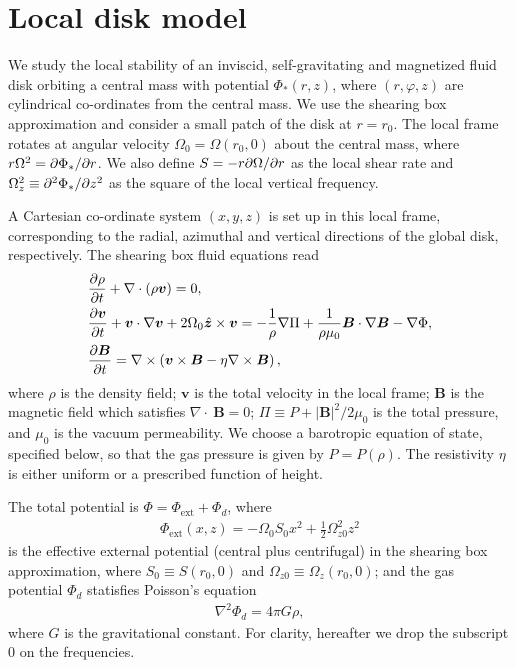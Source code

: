 \section{Local disk model}\label{setup}
We study the local stability of an inviscid, self-gravitating and
magnetized fluid disk orbiting a central mass with
potential $\Phi_*(r,z)$, where $(r,\varphi,z)$ are cylindrical
co-ordinates from the central mass. We use the shearing box approximation     
\citep{goldreich65b} and consider a small patch of the disk at
$r=r_0$. The local frame rotates at angular velocity 
$\Omega_0=\Omega(r_0,0)$ about the central mass, where $r\Omega^2 =
\partial\Phi_*/\partial r$. We also define $S=-r\partial\Omega/\partial r$ as the local shear
rate and $\Omega_z^2\equiv\partial^2\Phi_*/\partial z^2$ as the square of the
local vertical frequency. 

A Cartesian co-ordinate system $(x,y,z)$ is set
up in this local frame, corresponding to the radial, azimuthal and vertical
directions of the global disk, respectively. The shearing box fluid
equations read 
\begin{align} 
  &\frac{\partial\rho}{\partial t}+\nabla\cdot(\rho\bm{v}) = 0,\\
  &\frac{\partial \bm{v}}{\partial t} + \bm{v}\cdot\nabla\bm{v} +
  2\Omega_0\hat{\bm{z}}\times\bm{v} = - \frac{1}{\rho}\nabla\Pi +
  \frac{1}{\rho\mu_0}\bm{B}\cdot\nabla\bm{B}
  -\nabla\Phi,\\
  &\frac{\partial\bm{B}}{\partial t}= \nabla\times\left(\bm{v}\times\bm{B} -
  \eta\nabla\times\bm{B}\right), 
\end{align}
where $\rho$ is the density field; $\bm{v}$ is the total velocity in
the local frame; $\bm{B}$ is the magnetic field which satisfies
$\nabla\cdot~\bm{B}=0$; $\Pi \equiv P +
|\bm{B}|^2/2\mu_0$ is the total pressure, and $\mu_0$ is the vacuum
permeability. We choose a barotropic equation of state, specified
below, so that the gas pressure is given by $P=P(\rho)$. The
resistivity $\eta$ is either uniform or a prescribed function of
height. 


The total potential is $\Phi = \Phi_\mathrm{ext} + \Phi_d$, where
\begin{align}
  \Phi_\mathrm{ext}(x,z) = -\Omega_0 S_0 x^2 +
  \frac{1}{2}\Omega_{z0}^2z^2 
\end{align}
is the effective external potential (central plus centrifugal) in the
shearing box approximation, where $S_0\equiv S(r_0,0)$ and
$\Omega_{z0}\equiv\Omega_z(r_0,0)$; 
and the gas potential $\Phi_d$ statisfies Poisson's equation
\begin{align}
  \nabla^2\Phi_d = 4\pi G \rho, 
\end{align}
where $G$ is the gravitational constant. For clarity, hereafter we
drop the subscript $0$ on the frequencies. 

